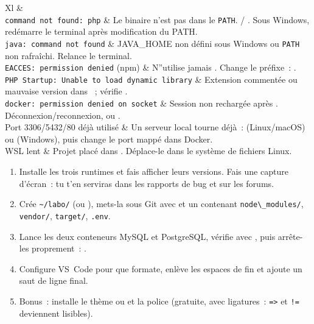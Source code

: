 \begin{tabz}{Xl}
  \headrow {} \&  \\
  \midrule
  \texttt{command not found: php} \& Le binaire n'est pas dans le \verb|PATH|.  / . Sous Windows, red\'emarre le terminal apr\`es modification du PATH.\\
  \texttt{java: command not found} \& JAVA\_HOME non d\'efini sous Windows ou \verb|PATH| non rafra\^ichi. Relance le terminal.\\
  \texttt{EACCES: permission denied} (npm) \& N''utilise jamais . Change le pr\'efixe~: .\\
  \texttt{PHP Startup: Unable to load dynamic library} \& Extension comment\'ee ou mauvaise version dans ~; v\'erifie .\\
  \texttt{docker: permission denied on socket} \& Session non recharg\'ee apr\`es . D\'econnexion/reconnexion, ou .\\
  Port 3306/5432/80 d\'ej\`a utilis\'e \& Un serveur local tourne d\'ej\`a~:  (Linux/macOS) ou  (Windows), puis change le port mapp\'e dans Docker.\\
  WSL lent \& Projet plac\'e dans . D\'eplace-le dans le syst\`eme de fichiers Linux.\\
\end{tabz}

\begin{exercice}
\begin{enumerate}
  \item Installe les trois runtimes et fais afficher leurs versions. Fais une capture d'\'ecran~:
        tu t'en serviras dans les rapports de bug et sur les forums.
  \item Cr\'ee \verb|~/labo/| (ou ), mets-la sous Git avec
         et un  contenant \verb|node\_modules/|,
        \verb|vendor/|, \verb|target/|, \verb|.env|.
  \item Lance les deux conteneurs MySQL et PostgreSQL, v\'erifie avec ,
        puis arr\^ete-les proprement~: .
  \item Configure VS~Code pour que  formate, enl\`eve les espaces de fin et ajoute
        un saut de ligne final.
  \item Bonus~: installe le th\`eme  ou
        et la police  (gratuite,
        avec ligatures~: \verb|=>| et \verb|!=| deviennent lisibles).
\end{enumerate}
\end{exercice}

